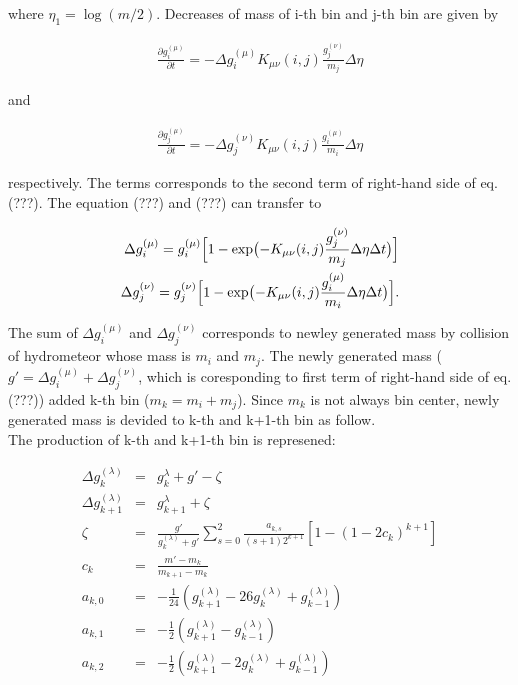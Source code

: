  where $\eta_{1}=\log(m/2)$. Decreases of mass of i-th bin and j-th bin are given by

\begin{eqnarray}
\frac{\partial g_{i}^{(\mu)}}{\partial t}=-\Delta g^{(\mu)}_{i} K_{\mu\nu}(i,j)\frac{g_{j}^{(\nu)}}{m_{j}}\Delta \eta
\end{eqnarray}

and


\begin{eqnarray}
\frac{\partial g_{j}^{(\mu)}}{\partial t}=-\Delta g^{(\nu)}_{j}K_{\mu\nu}(i,j)\frac{g_{i}^{(\mu)}}{m_{i}}\Delta \eta
\end{eqnarray}

respectively. The terms corresponds to the second term of right-hand side of eq.(???). The equation (???) and (???) can transfer to

\begin{eqnarray}
\Delta g_{i}^{(\mu)}=g_{i}^{(\mu)}\Bigl [1-\exp\bigl(-K_{\mu\nu}(i,j)\frac{g^{(\nu)}_{j}}{m_{j}}\Delta \eta\Delta t\bigr) \Bigl]\\ 
\Delta g_{j}^{(\nu)}=g_{j}^{(\nu)}\Bigl [1-\exp\bigl(-K_{\mu\nu}(i,j)\frac{g^{(\mu)}_{i}}{m_{i}}\Delta \eta\Delta t\bigr) \Bigl].
\end{eqnarray}

The sum of $\Delta g_{i}^{(\mu)}$ and $\Delta g_{j}^{(\nu)}$ corresponds to newley generated mass by collision of hydrometeor whose mass is $m_{i}$ and $m_{j}$. The newly generated mass ($g'=\Delta g_{i}^{(\mu)}+\Delta g_{j}^{(\nu)}$, which is coresponding to first term of right-hand side of eq.(???)) added k-th bin ($m_{k}=m_{i}+m_{j}$). Since $m_{k}$ is not always bin center, newly generated mass is devided to k-th and k+1-th bin as follow.\\
The production of k-th and k+1-th bin is represened:

\begin{eqnarray}
\Delta g_{k}^{(\lambda)}&=&g_{k}^{\lambda}+g'-\zeta\\
\Delta g_{k+1}^{(\lambda)}&=&g_{k+1}^{\lambda}+\zeta\\
\zeta&=&\frac{g'}{g_{k}^{(\lambda)}+g'}\sum_{s=0}^{2}\frac{a_{k,s}}{(s+1)2^{k+1}}[1-(1-2c_{k})^{k+1}]\nonumber\\
c_{k}&=&\frac{m'-m_{k}}{m_{k+1}-m_{k}}\nonumber\\
a_{k,0}&=&-\frac{1}{24}(g_{k+1}^{(\lambda)}-26g_{k}^{(\lambda)}+g_{k-1}^{(\lambda)})\nonumber\\
a_{k,1}&=&-\frac{1}{2}(g_{k+1}^{(\lambda)}-g_{k-1}^{(\lambda)})\nonumber\\
a_{k,2}&=&-\frac{1}{2}(g_{k+1}^{(\lambda)}-2g_{k}^{(\lambda)}+g_{k-1}^{(\lambda)})\nonumber
\end{eqnarray}

